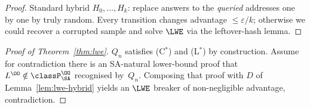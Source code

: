 \begin{proof}
Standard hybrid $H_0,\dots,H_k$:
replace answers to the \emph{queried} addresses
one by one by truly random.
Every transition changes advantage $\le \varepsilon/k$;
otherwise we could recover a corrupted sample
and solve $\LWE$ via the leftover-hash lemma.
\end{proof}

\begin{proof}[Proof of Theorem~\ref{thm:lwe}]
$Q_n$ satisfies (C$^*$) and (L$^*$) by construction.
Assume for contradiction there is an SA-natural 
lower-bound proof that $L^\OO\notin\classP_{\SA}^\OO$
recognised by~$Q_n$.
Composing that proof with $D$ of Lemma~\ref{lem:lwe-hybrid}
yields an $\LWE$ breaker of non-negligible advantage,
contradiction.
\end{proof}
